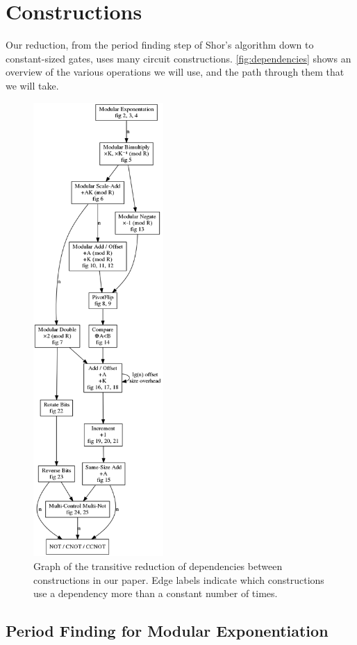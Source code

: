 \documentclass[twocolumn,longbibliography]{quantumarticle-customized}
\begin{document}
\section{Constructions} \label{sec:construct}

Our reduction, from the period finding step of Shor's algorithm down to constant-sized gates, uses many circuit constructions.
\autoref{fig:dependencies} shows an overview of the various operations we will use, and the path through them that we will take.

\begin{figure}
  \centering
  \includegraphics[height=17.3cm]{assets/dependencies.png}
  \caption{
    Graph of the transitive reduction of dependencies between constructions in our paper.
    Edge labels indicate which constructions use a dependency more than a constant number of times.
  }
  \label{fig:dependencies}
\end{figure}

\subsection{Period Finding for Modular Exponentiation}
\end{document}
